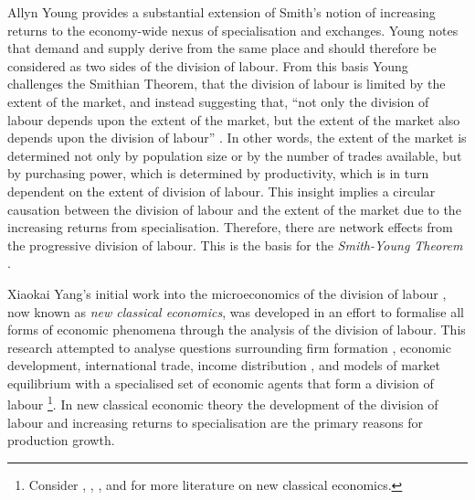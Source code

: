 Allyn Young provides a substantial extension of Smith's notion of increasing returns to the economy-wide nexus of specialisation and exchanges. Young notes that demand and supply derive from the same place and should therefore be considered as two sides of the division of labour. From this basis Young challenges the Smithian Theorem, that the division of labour is limited by the extent of the market, and instead suggesting that, ``not only the division of labour depends upon the extent of the market, but the extent of the market also depends upon the division of labour'' \citep[p.~539]{Young1928}. In other words, the extent of the market is determined not only by population size or by the number of trades available, but by purchasing power, which is determined by productivity, which is in turn dependent on the extent of division of labour. This insight implies a circular causation between the division of labour and the extent of the market due to the increasing returns from specialisation. Therefore, there are network effects from the progressive division of labour. This is the basis for the \textit{Smith-Young Theorem} \citep{Yang2001}.

Xiaokai Yang's initial work into the microeconomics of the division of labour \citep{Yang1988}, now known as \emph{new classical economics}, was developed in an effort to formalise all forms of economic phenomena through the analysis of the division of labour. This research attempted to analyse questions surrounding firm formation \citep{YangNg1995, Yang2000}, economic development, international trade, income distribution \citep{YangZhang2003}, and models of market equilibrium with a specialised set of economic agents that form a division of labour \citep{Yao2002, SunYangZhou2004, YangYao2005} \footnote{Consider \citet{YangNg1993}, \citet{YangChengShi2005}, \citet{TombazosYang2006}, and \citet{YangLiu2008} for more literature on new classical economics.}. In new classical economic theory the development of the division of labour and increasing returns to specialisation are the primary reasons for production growth. 


